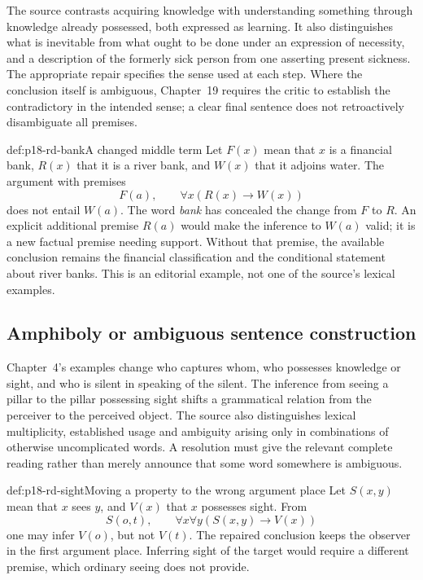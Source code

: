 The source contrasts acquiring knowledge with understanding something
through knowledge already possessed, both expressed as learning. It
also distinguishes what is inevitable from what ought to be done under
an expression of necessity, and a description of the formerly sick
person from one asserting present sickness. The appropriate repair
specifies the sense used at each step. Where the conclusion itself
is ambiguous, Chapter~19 requires the critic to establish the
contradictory in the intended sense; a clear final sentence does not
retroactively disambiguate all premises.

\begin{hbexample}{def:p18-rd-bank}{A changed middle term}
Let \(F(x)\) mean that \(x\) is a financial bank, \(R(x)\)
that it is a river bank, and \(W(x)\) that it adjoins water. The
argument with premises
\[
 F(a),\qquad \forall x(R(x)\to W(x))
\]
does not entail \(W(a)\). The word \emph{bank} has concealed the
change from \(F\) to \(R\). An explicit additional premise
\(R(a)\) would make the inference to \(W(a)\) valid; it is a
new factual premise needing support. Without that premise, the
available conclusion remains the financial classification and the
conditional statement about river banks. This is an editorial example,
not one of the source's lexical examples.
\end{hbexample}

\subsection{Amphiboly or ambiguous sentence construction}

Chapter~4's examples change who captures whom, who possesses knowledge
or sight, and who is silent in speaking of the silent. The inference
from seeing a pillar to the pillar possessing sight shifts a grammatical
relation from the perceiver to the perceived object. The source also
distinguishes lexical multiplicity, established usage and ambiguity
arising only in combinations of otherwise uncomplicated words. A
resolution must give the relevant complete reading rather than merely
announce that some word somewhere is ambiguous.

\begin{hbexample}{def:p18-rd-sight}{Moving a property to the wrong argument place}
Let \(S(x,y)\) mean that \(x\) sees \(y\), and \(V(x)\)
that \(x\) possesses sight. From
\[
 S(o,t),\qquad \forall x\forall y(S(x,y)\to V(x))
\]
one may infer \(V(o)\), but not \(V(t)\). The repaired conclusion
keeps the observer in the first argument place. Inferring sight of
the target would require a different premise, which ordinary seeing
does not provide.
\end{hbexample}

